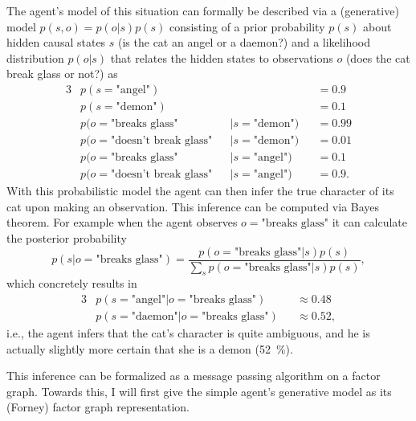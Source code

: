 The agent's model of this situation can formally be described via a (generative) model \(p(s,o)=p(o|s)p(s)\) consisting of a prior probability \(p(s)\) about hidden causal states \(s\) (is the cat an angel or a daemon?) and a likelihood distribution \(p(o|s)\) that relates the hidden states to observations \(o\) (does the cat break glass or not?) as
\begin{alignat}{3}
     & p(s=\text{"angel"})             &  &                    &  & = 0.9 \nonumber  \\
     & p(s=\text{"demon"})             &  &                    &  & = 0.1  \\
     & p(o=\text{"breaks glass"}        &  & |s=\text{"demon"}) &  & = 0.99 \nonumber \\
     & p(o=\text{"doesn't break glass"} &  & |s=\text{"demon"}) &  & = 0.01 \nonumber \\
     & p(o=\text{"breaks glass"}        &  & |s=\text{"angel"}) &  & = 0.1 \nonumber \\
     & p(o=\text{"doesn't break glass"} &  & |s=\text{"angel"}) &  & = 0.9.
\end{alignat}
With this probabilistic model the agent can then infer the true character of its cat upon making an observation. This inference can be computed via Bayes theorem. For example when the agent observes \(o=\text{"breaks glass"}\) it can calculate the posterior probability
\begin{equation}
    p(s|o=\text{"breaks glass"}) = \frac{p(o=\text{"breaks glass"}|s)p(s)}{\sum_s p(o=\text{"breaks glass"}|s)p(s)},
\end{equation}
which concretely results in
\begin{alignat}{3}
     & p(s=\text{"angel"}|o=\text{"breaks glass"})  &  & \approx 0.48 \nonumber \\
     & p(s=\text{"daemon"}|o=\text{"breaks glass"}) &  & \approx 0.52,
\end{alignat}
i.e., the agent infers that the cat's character is quite ambiguous, and he is actually slightly more certain that she is a demon (\qty{52}{\%}).

This inference can be formalized as a message passing algorithm on a factor graph. Towards this, I will first give the simple agent's generative model as its (Forney) factor graph representation.

